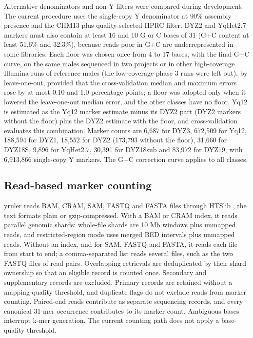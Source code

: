 \documentclass[pdflatex,sn-nature]{sn-jnl}
\begin{document}
Alternative denominators and non-Y filters were compared during development. The current procedure uses the single-copy Y denominator at 90\% assembly presence and the CHM13 plus quality-selected HPRC filter. DYZ2 and YqHet2.7 markers must also contain at least 16 and 10 G or C bases of 31 (G+C content at least 51.6\% and 32.3\%), because reads poor in G+C are underrepresented in some libraries. Each floor was chosen once from 4 to 17 bases, with the final G+C curve, on the same males sequenced in two projects or in other high-coverage Illumina runs of reference males (the low-coverage phase 3 runs were left out), by leave-one-out, provided that the cross-validation median and maximum errors rose by at most 0.10 and 1.0 percentage points; a floor was adopted only when it lowered the leave-one-out median error, and the other classes have no floor. Yq12 is estimated as the Yq12 marker estimate minus its DYZ2 part (DYZ2 markers without the floor) plus the DYZ2 estimate with the floor, and cross-validation evaluates this combination. Marker counts are 6,687 for DYZ3, 672,509 for Yq12, 188,594 for DYZ1, 18,552 for DYZ2 (173,793 without the floor), 31,660 for DYZ18S, 9,896 for YqHet2.7, 30,391 for DYZ18sub and 83,972 for DYZ19, with 6,913,866 single-copy Y markers. The G+C correction curve applies to all classes.


\subsection{Read-based marker counting}\label{sec:m-counting}
yruler reads BAM, CRAM, SAM, FASTQ and FASTA files through HTSlib \cite{Bonfield2021}, the text formats plain or gzip-compressed. With a BAM or CRAM index, it reads parallel genomic shards: whole-file shards are 10 Mb windows plus unmapped reads, and restricted-region mode uses merged BED intervals plus unmapped reads. Without an index, and for SAM, FASTQ and FASTA, it reads each file from start to end; a comma-separated list reads several files, such as the two FASTQ files of read pairs. Overlapping retrievals are deduplicated by their shard ownership so that an eligible record is counted once. Secondary and supplementary records are excluded. Primary records are retained without a mapping-quality threshold, and duplicate flags do not exclude reads from marker counting. Paired-end reads contribute as separate sequencing records, and every canonical 31-mer occurrence contributes to its marker count. Ambiguous bases interrupt k-mer generation. The current counting path does not apply a base-quality threshold.
\end{document}
